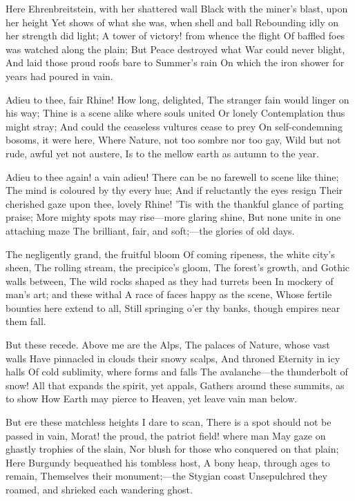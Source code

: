 \documentclass[10pt,twocolumn]{book}
\begin{document}
   Here Ehrenbreitstein, with her shattered wall
   Black with the miner's blast, upon her height
   Yet shows of what she was, when shell and ball
   Rebounding idly on her strength did light;
   A tower of victory! from whence the flight
   Of baffled foes was watched along the plain;
   But Peace destroyed what War could never blight,
   And laid those proud roofs bare to Summer's rain\textemdash
On which the iron shower for years had poured in vain.


   Adieu to thee, fair Rhine!  How long, delighted,
   The stranger fain would linger on his way;
   Thine is a scene alike where souls united
   Or lonely Contemplation thus might stray;
   And could the ceaseless vultures cease to prey
   On self-condemning bosoms, it were here,
   Where Nature, not too sombre nor too gay,
   Wild but not rude, awful yet not austere,
Is to the mellow earth as autumn to the year.


   Adieu to thee again! a vain adieu!
   There can be no farewell to scene like thine;
   The mind is coloured by thy every hue;
   And if reluctantly the eyes resign
   Their cherished gaze upon thee, lovely Rhine!
   'Tis with the thankful glance of parting praise;
   More mighty spots may rise---more glaring shine,
   But none unite in one attaching maze
The brilliant, fair, and soft;---the glories of old days.


   The negligently grand, the fruitful bloom
   Of coming ripeness, the white city's sheen,
   The rolling stream, the precipice's gloom,
   The forest's growth, and Gothic walls between,
   The wild rocks shaped as they had turrets been
   In mockery of man's art; and these withal
   A race of faces happy as the scene,
   Whose fertile bounties here extend to all,
Still springing o'er thy banks, though empires near them fall.

   But these recede.  Above me are the Alps,
   The palaces of Nature, whose vast walls
   Have pinnacled in clouds their snowy scalps,
   And throned Eternity in icy halls
   Of cold sublimity, where forms and falls
   The avalanche---the thunderbolt of snow!
   All that expands the spirit, yet appals,
   Gathers around these summits, as to show
How Earth may pierce to Heaven, yet leave vain man below.


   But ere these matchless heights I dare to scan,
   There is a spot should not be passed in vain,\textemdash
   Morat! the proud, the patriot field! where man
   May gaze on ghastly trophies of the slain,
   Nor blush for those who conquered on that plain;
   Here Burgundy bequeathed his tombless host,
   A bony heap, through ages to remain,
   Themselves their monument;---the Stygian coast
Unsepulchred they roamed, and shrieked each wandering ghost.
\end{document}
